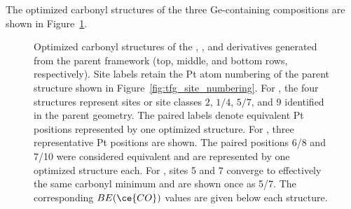 The optimized carbonyl structures of the three Ge-containing compositions are
shown in Figure~\ref{fig:tfg_ptgeco_series}.

\begin{figure}[H]
\centering

\caption{Optimized carbonyl structures of the , ,
and  derivatives generated from the  parent framework
(top, middle, and bottom rows, respectively). Site labels retain the Pt atom
numbering of the parent structure shown in Figure~\ref{fig:tfg_site_numbering}.
For , the four structures represent sites or site classes
$2$, $1/4$, $5/7$, and $9$ identified in the parent geometry. The paired
labels denote equivalent Pt positions represented by one optimized structure.
For , three representative Pt positions are shown. The paired
positions 6/8 and 7/10 were considered equivalent and are represented by one
optimized structure each. For , sites 5 and 7 converge to
effectively the same carbonyl minimum and are shown once as 5/7. The
corresponding $BE(\ce{CO})$ values are given
below each structure.}
\label{fig:tfg_ptgeco_series}
\end{figure}
